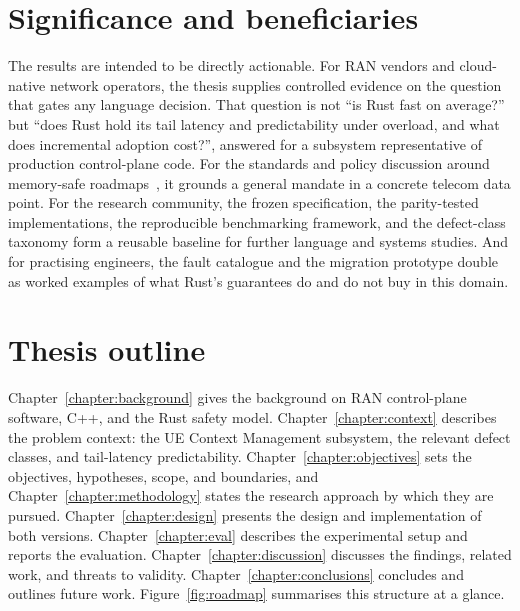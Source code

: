 \documentclass[english,twoside,openright,a4paper,censored,csm,software-track-2020]{HYthesisML}
\begin{document}
\section{Significance and beneficiaries}
The results are intended to be directly actionable. For RAN vendors and cloud-native network
operators, the thesis supplies controlled evidence on the question that gates any language
decision. That question is not ``is Rust fast on average?'' but ``does Rust hold its tail latency and
predictability under overload, and what does incremental adoption cost?'', answered for a subsystem
representative of production control-plane code. For the standards and policy discussion around
memory-safe roadmaps~\cite{cisa2023memorysafe,oncd2024building}, it grounds a general mandate in
a concrete telecom data point. For the research community, the frozen specification, the
parity-tested implementations, the reproducible benchmarking framework, and the defect-class
taxonomy form a reusable baseline for further language and systems studies. And for practising
engineers, the fault catalogue and the migration prototype double as worked examples of what
Rust's guarantees do and do not buy in this domain.

\section{Thesis outline}
Chapter~\ref{chapter:background} gives the background on RAN control-plane software, C++,
and the Rust safety model. Chapter~\ref{chapter:context} describes the problem context: the
UE Context Management subsystem, the relevant defect classes, and tail-latency
predictability. Chapter~\ref{chapter:objectives} sets the objectives, hypotheses, scope, and
boundaries, and Chapter~\ref{chapter:methodology} states the research approach by which they
are pursued.
Chapter~\ref{chapter:design} presents the design and implementation of both versions.
Chapter~\ref{chapter:eval} describes the experimental setup and reports the evaluation.
Chapter~\ref{chapter:discussion} discusses the findings, related work, and threats to
validity. Chapter~\ref{chapter:conclusions} concludes and outlines future work.
Figure~\ref{fig:roadmap} summarises this structure at a glance.
\end{document}
